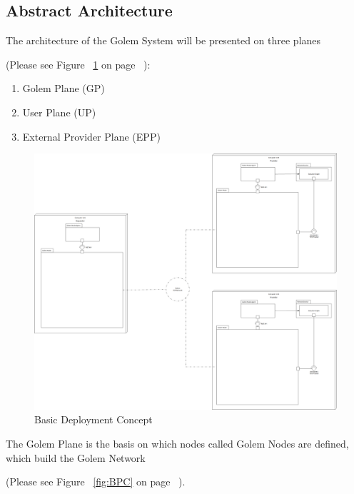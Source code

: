 \newpage

\subsection{Abstract Architecture}

The architecture of the Golem System will be presented on three planes 

(Please see Figure ~\ref{fig:BDC} on page ~\pageref{fig:BDC}):

\begin{enumerate}
	\item Golem Plane (GP)
	\item User Plane (UP)
	\item External Provider Plane (EPP)
\end{enumerate}

\begin{figure}[H]
    \centering
    \includegraphics[width=12cm,angle=0]{./diag/Abstract/BasicDeployment-Abstract.png}
    \caption{Basic Deployment Concept}
	\label{fig:BDC}
\end{figure}

The Golem Plane is the basis on which nodes called Golem Nodes are defined, which build the Golem Network 

(Please see Figure ~\ref{fig:BPC} on page ~\pageref{fig:BPC}).

